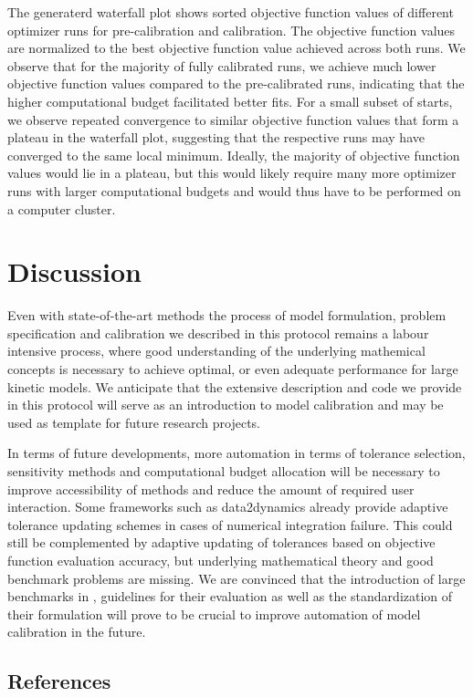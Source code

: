 \documentclass[11pt]{article}
\begin{document}
    The generaterd waterfall plot shows sorted objective function values of
different optimizer runs for pre-calibration and calibration. The
objective function values are normalized to the best objective function
value achieved across both runs. We observe that for the majority of
fully calibrated runs, we achieve much lower objective function values
compared to the pre-calibrated runs, indicating that the higher
computational budget facilitated better fits. For a small subset of
starts, we observe repeated convergence to similar objective function
values that form a plateau in the waterfall plot, suggesting that the
respective runs may have converged to the same local minimum. Ideally,
the majority of objective function values would lie in a plateau, but
this would likely require many more optimizer runs with larger
computational budgets and would thus have to be performed on a computer
cluster.

    \hypertarget{discussion}{%
\section{Discussion}\label{discussion}}

Even with state-of-the-art methods the process of model formulation,
problem specification and calibration we described in this protocol
remains a labour intensive process, where good understanding of the
underlying mathemical concepts is necessary to achieve optimal, or even
adequate performance for large kinetic models. We anticipate that the
extensive description and code we provide in this protocol will serve as
an introduction to model calibration and may be used as template for
future research projects.

In terms of future developments, more automation in terms of tolerance
selection, sensitivity methods and computational budget allocation will
be necessary to improve accessibility of methods and reduce the amount
of required user interaction. Some frameworks such as data2dynamics
\cite{2754712/RYRYBYZA} already provide adaptive tolerance updating
schemes in cases of numerical integration failure. This could still be
complemented by adaptive updating of tolerances based on objective
function evaluation accuracy, but underlying mathematical theory and
good benchmark problems are missing. We are convinced that the
introduction of large benchmarks in \cite{2754712/FMD3RVCR}
\cite{2754712/INKV577L}, guidelines for their evaluation
\cite{2754712/NYMSV8TA} as well as the standardization of their
formulation \cite{2754712/86CV69R2} will prove to be crucial to improve
automation of model calibration in the future.

    \hypertarget{references}{%
\subsection{References}\label{references}}




    
    
    
\end{document}
